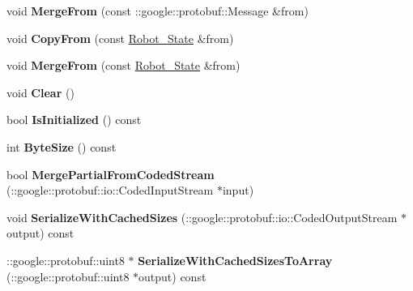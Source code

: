 \begin{DoxyCompactItemize}
\item 
\hypertarget{classvss__state_1_1Robot__State_a5f5cb63411c8f37399dfd169c94e6e54}{void {\bfseries Merge\-From} (const \-::google\-::protobuf\-::\-Message \&from)}\label{classvss__state_1_1Robot__State_a5f5cb63411c8f37399dfd169c94e6e54}

\item 
\hypertarget{classvss__state_1_1Robot__State_a4e18e564b9c470d6f382c8c1c040cfb4}{void {\bfseries Copy\-From} (const \hyperlink{classvss__state_1_1Robot__State}{Robot\-\_\-\-State} \&from)}\label{classvss__state_1_1Robot__State_a4e18e564b9c470d6f382c8c1c040cfb4}

\item 
\hypertarget{classvss__state_1_1Robot__State_a66fadfccfb89ba8742bafa6cd9597420}{void {\bfseries Merge\-From} (const \hyperlink{classvss__state_1_1Robot__State}{Robot\-\_\-\-State} \&from)}\label{classvss__state_1_1Robot__State_a66fadfccfb89ba8742bafa6cd9597420}

\item 
\hypertarget{classvss__state_1_1Robot__State_a78f3f24cbb0f2e1fac867550bf05da91}{void {\bfseries Clear} ()}\label{classvss__state_1_1Robot__State_a78f3f24cbb0f2e1fac867550bf05da91}

\item 
\hypertarget{classvss__state_1_1Robot__State_ae482d98ba51e51887efe37a4d2f6abb5}{bool {\bfseries Is\-Initialized} () const }\label{classvss__state_1_1Robot__State_ae482d98ba51e51887efe37a4d2f6abb5}

\item 
\hypertarget{classvss__state_1_1Robot__State_a6ff13cd34434ab985d2b560a13219532}{int {\bfseries Byte\-Size} () const }\label{classvss__state_1_1Robot__State_a6ff13cd34434ab985d2b560a13219532}

\item 
\hypertarget{classvss__state_1_1Robot__State_a82a0f5270a13c5211d94c6da6726ab8d}{bool {\bfseries Merge\-Partial\-From\-Coded\-Stream} (\-::google\-::protobuf\-::io\-::\-Coded\-Input\-Stream $\ast$input)}\label{classvss__state_1_1Robot__State_a82a0f5270a13c5211d94c6da6726ab8d}

\item 
\hypertarget{classvss__state_1_1Robot__State_a67b812e24a55cdfad4d58049f8e0e674}{void {\bfseries Serialize\-With\-Cached\-Sizes} (\-::google\-::protobuf\-::io\-::\-Coded\-Output\-Stream $\ast$output) const }\label{classvss__state_1_1Robot__State_a67b812e24a55cdfad4d58049f8e0e674}

\item 
\hypertarget{classvss__state_1_1Robot__State_a2a833a548c45c6e25eaba0e9855ed563}{\-::google\-::protobuf\-::uint8 $\ast$ {\bfseries Serialize\-With\-Cached\-Sizes\-To\-Array} (\-::google\-::protobuf\-::uint8 $\ast$output) const }\label{classvss__state_1_1Robot__State_a2a833a548c45c6e25eaba0e9855ed563}


\end{DoxyCompactItemize}
